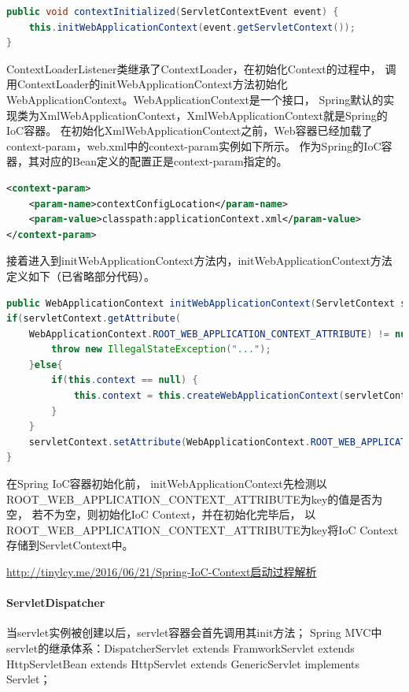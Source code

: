 \documentclass{book}
\begin{document}
\begin{lstlisting}[language=Java]
public void contextInitialized(ServletContextEvent event) {
	this.initWebApplicationContext(event.getServletContext());
}
\end{lstlisting}

ContextLoaderListener类继承了ContextLoader，在初始化Context的过程中，
调用ContextLoader的initWebApplicationContext方法初始化WebApplicationContext。WebApplicationContext是一个接口，
Spring默认的实现类为XmlWebApplicationContext，XmlWebApplicationContext就是Spring的IoC容器。
在初始化XmlWebApplicationContext之前，Web容器已经加载了context-param，web.xml中的context-param实例如下所示。
作为Spring的IoC容器，其对应的Bean定义的配置正是context-param指定的。

\begin{lstlisting}[language=XML]
<context-param>
	<param-name>contextConfigLocation</param-name>
	<param-value>classpath:applicationContext.xml</param-value>
</context-param>
\end{lstlisting}

接着进入到initWebApplicationContext方法内，initWebApplicationContext方法定义如下（已省略部分代码）。

\begin{lstlisting}[language=Java]
public WebApplicationContext initWebApplicationContext(ServletContext servletContext) {      
if(servletContext.getAttribute(
	WebApplicationContext.ROOT_WEB_APPLICATION_CONTEXT_ATTRIBUTE) != null) {
		throw new IllegalStateException("...");
	}else{
		if(this.context == null) {
			this.context = this.createWebApplicationContext(servletContext);
		}
	}
	servletContext.setAttribute(WebApplicationContext.ROOT_WEB_APPLICATION_CONTEXT_ATTRIBUTE, this.context);
}
\end{lstlisting}

在Spring IoC容器初始化前，
initWebApplicationContext先检测以ROOT\_WEB\_APPLICATION\_CONTEXT\_ATTRIBUTE为key的值是否为空，
若不为空，则初始化IoC Context，并在初始化完毕后，
以ROOT\_WEB\_APPLICATION\_CONTEXT\_ATTRIBUTE为key将IoC Context存储到ServletContext中。

\url{http://tinylcy.me/2016/06/21/Spring-IoC-Context启动过程解析}

\paragraph{ServletDispatcher}

当servlet实例被创建以后，servlet容器会首先调用其init方法；
Spring MVC中servlet的继承体系：DispatcherServlet extends FramworkServlet 
extends HttpServletBean extends HttpServlet extends GenericServlet implements Servlet；
\end{document}
